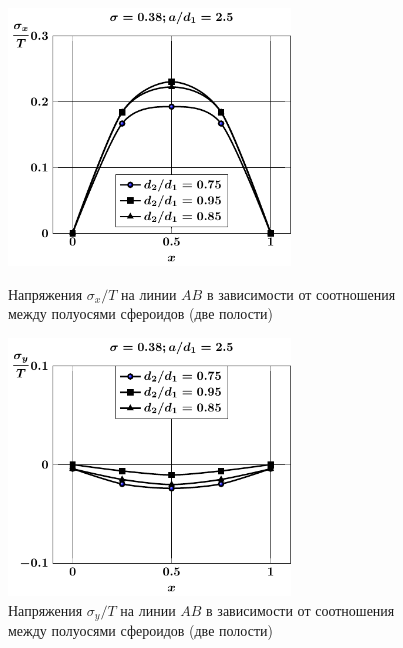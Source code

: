 %

\begin{figure}[h!]
\centering\footnotesize
\parbox[b]{7.5cm}{\centering\includegraphics[width=7.5cm]{cav2-d-sig_x.pdf}
\caption{Напряжения $\sigma_x/T$ на линии $AB$ в зависимости от соотношения между полуосями сфероидов (две полости)
\label{f:9:8}}}\hfil\hfil
\parbox[b]{7.5cm}{\centering\includegraphics[width=7.5cm]{cav2-d-sig_y.pdf}
\caption{Напряжения $\sigma_y/T$ на линии $AB$ в зависимости от соотношения между полуосями сфероидов (две полости)
\label{f:9:9}}}
\end{figure}

%

